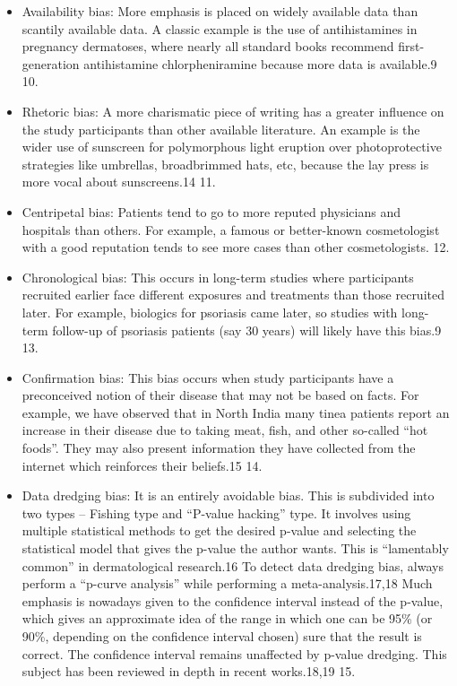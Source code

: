 \documentclass[12pt, a4paper, oneside]{book}   	%
\begin{document}
\begin{itemize}
				\item  Availability bias: More emphasis is placed on widely available data than scantily available data. A classic example is the use of antihistamines in pregnancy dermatoses, where nearly all standard books recommend first-generation antihistamine chlorpheniramine because more data is available.9 10. \autocite{Chakraborty_2023}
				\item Rhetoric bias: A more charismatic piece of writing has a greater influence on the study participants than other available literature. An example is the wider use of sunscreen for polymorphous light eruption over photoprotective strategies like umbrellas, broadbrimmed hats, etc, because the lay press is more vocal about sunscreens.14 11. \autocite{Chakraborty_2023}
				\item Centripetal bias: Patients tend to go to more reputed physicians and hospitals than others. For example, a famous or better-known cosmetologist with a good reputation tends to see more cases than other cosmetologists. 12.\autocite{Chakraborty_2023}
				\item  Chronological bias: This occurs in long-term studies where participants recruited earlier face different exposures and treatments than those recruited later. For example, biologics for psoriasis came later, so studies with long-term follow-up of psoriasis patients (say 30 years) will likely have this bias.9 13.\autocite{Chakraborty_2023}
				\item  Confirmation bias: This bias occurs when study participants have a preconceived notion of their disease that may not be based on facts. For example, we have observed that in North India many tinea patients report an increase in their disease due to taking meat, fish, and other so-called “hot foods”. They may also present information they have collected from the internet which reinforces their beliefs.15 14.\autocite{Chakraborty_2023}
				\item  Data dredging bias: It is an entirely avoidable bias. This is subdivided into two types – Fishing type and “P-value hacking” type. It involves using multiple statistical methods to get the desired p-value and selecting the statistical model that gives the p-value the author wants. This is “lamentably common” in dermatological research.16 To detect data dredging bias, always perform a “p-curve analysis” while performing a meta-analysis.17,18 Much emphasis is nowadays given to the confidence interval instead of the p-value, which gives an approximate idea of the range in which one can be 95\% (or 90\%, depending on the confidence interval chosen) sure that the result is correct. The confidence interval remains unaffected by p-value dredging. This subject has been reviewed in depth in recent works.18,19 15.\autocite{Chakraborty_2023}

\end{itemize}
\end{document}
